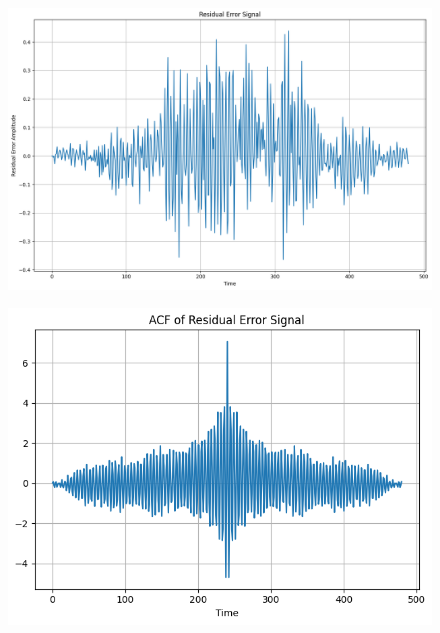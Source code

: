 \documentclass{article}
\begin{document}
\begin{figure}[H]
\begin{center}
\includegraphics[scale = 0.5]{res2.png}
\end{center}
\end{figure}

\begin{figure}[H]
\begin{center}
\includegraphics[scale = 0.8]{acf_err2.png}
\end{center}
\end{figure}
\end{document}
